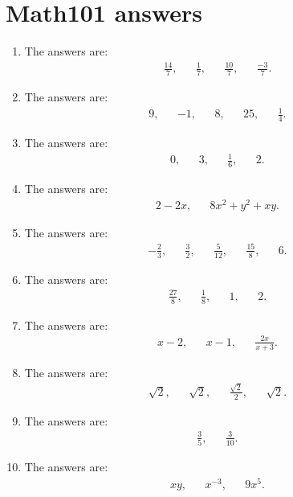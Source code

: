 \section{Math101 answers}

\begin{enumerate}
\item The answers are:
\begin{align*}
\frac{14}{7},&& \frac{1}{7},&& \frac{10}{7},&& \frac{-3}{7}.
\end{align*}

\item The answers are:
\begin{align*}
9,&& -1,&& 8,&& 25,&& \frac{1}{4}.
\end{align*}

\item The answers are:
\begin{align*}
0,&& 3,&& \frac{1}{6},&& 2.
\end{align*}
\item The answers are:
\begin{align*}
2-2x,&& 8x^2+y^2+xy.
\end{align*}

\item The answers are:
\begin{align*}
-\frac{2}{3},&&\frac{3}{2},&& \frac{5}{12},&& \frac{15}{8},&& 6.
\end{align*}

\item The answers are:
\begin{align*}
\frac{27}{8},&& \frac{1}{8},&& 1,&& 2.
\end{align*}

\item The answers are:
\begin{align*}
x-2,&& x-1,&&\frac{2x}{x+3}.
\end{align*}

\item The answers are:
\begin{align*}
\sqrt{2},&& \sqrt{2},&& \frac{\sqrt{2}}{2},&& \sqrt{2}.
\end{align*}

\item The answers are:
\begin{align*}
\frac{3}{5},&&\frac{3}{10}.
\end{align*}

\item The answers are:
\begin{align*}
xy,&& x^{-3},&& 9x^5.
\end{align*}





\end{enumerate}
